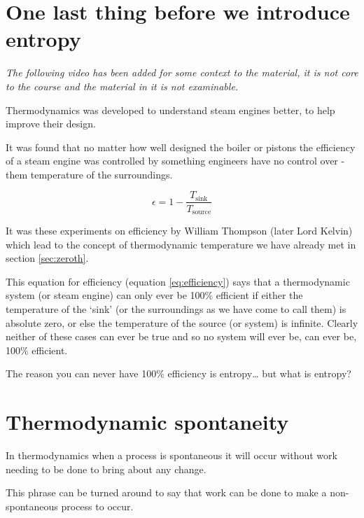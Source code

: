 \documentclass[
]{book}
\begin{document}
\hypertarget{one-last-thing-before-we-introduce-entropy}{%
\section{One last thing before we introduce entropy}\label{one-last-thing-before-we-introduce-entropy}}

\emph{The following video has been added for some context to the material, it is not core to the course and the material in it is not examinable.}

Thermodynamics was developed to understand steam engines better, to help improve their design.

It was found that no matter how well designed the boiler or pistons the efficiency of a steam engine was controlled by something engineers have no control over - them temperature of the surroundings.

\begin{equation}
\epsilon = 1-\frac{T_{\textrm{sink}}}{T_{\textrm{source}}}
\label{eq:efficiency}
\end{equation}

It was these experiments on efficiency by William Thompson (later Lord Kelvin) which lead to the concept of thermodynamic temperature we have already met in section \ref{sec:zeroth}.

This equation for efficiency (equation \eqref{eq:efficiency}) says that a thermodynamic system (or steam engine) can only ever be 100\% efficient if either the temperature of the `sink' (or the surroundings as we have come to call them) is absolute zero, or else the temperature of the source (or system) is infinite. Clearly neither of these cases can ever be true and so no system will ever be, can ever be, 100\% efficient.

The reason you can never have 100\% efficiency is entropy\ldots{} but what is entropy?

\hypertarget{thermodynamic-spontaneity}{%
\section{Thermodynamic spontaneity}\label{thermodynamic-spontaneity}}

In thermodynamics when a process is spontaneous it will occur without work needing to be done to bring about any change.

This phrase can be turned around to say that work can be done to make a non-spontaneous process to occur.
\end{document}

